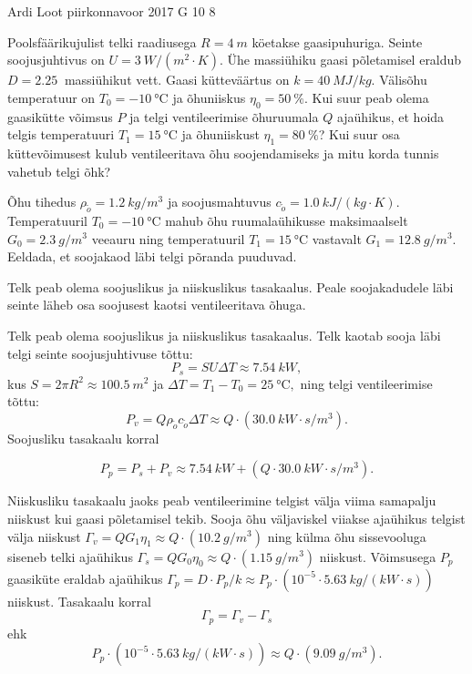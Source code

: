 {Ardi Loot} %
{piirkonnavoor} %
{2017} %
{G 10} %
{8} %
{
\ifStatement
Poolsfäärikujulist telki raadiusega $R=\SI{4}{m}$ köetakse
gaasipuhuriga. Seinte soojusjuhtivus on $U=\SI{3}{W/\left(m^{2}\cdot K\right)}$.
Ühe massiühiku gaasi põletamisel eraldub $D=\SI{2.25}{}$ massiühikut vett. Gaasi kütteväärtus on $k=\SI{40}{MJ/kg}$. Välisõhu temperatuur on $T_{0}=\SI{-10}{\celsius}$
ja õhuniiskus $\eta_{0}=\SI{50}{\percent}.$ Kui suur peab olema gaasikütte
võimsus $P$ ja telgi ventileerimise õhuruumala $Q$ ajaühikus, et hoida telgis
temperatuuri $T_{1}=\SI{15}{\celsius}$ ja õhuniiskust $\eta_{1}=\SI{80}{\percent}$?
Kui suur osa küttevõimusest kulub ventileeritava õhu soojendamiseks
ja mitu korda tunnis vahetub telgi õhk?

Õhu tihedus $\rho_{\tilde{o}}=\SI{1.2}{kg/m^{3}}$ ja soojusmahtuvus
$c_{\tilde{o}}=\SI{1.0}{kJ/\left(kg\cdot K\right)}$. Temperatuuril
$T_{0}=\SI{-10}{\celsius}$ mahub õhu ruumalaühikusse maksimaalselt
$G_{0}=\SI{2.3}{g/m^{3}}$ veeauru ning temperatuuril $T_{1}=\SI{15}{\celsius}$
vastavalt $G_{1}=\SI{12.8}{g/m^{3}}.$ Eeldada, et soojakaod läbi
telgi põranda puuduvad.
\fi


\ifHint
Telk peab olema soojuslikus ja niiskuslikus tasakaalus. Peale soojakadudele läbi seinte läheb osa soojusest kaotsi ventileeritava õhuga.
\fi


\ifSolution
Telk peab olema soojuslikus ja niiskuslikus tasakaalus. Telk kaotab
sooja läbi telgi seinte soojusjuhtivuse tõttu:
\[
P_{s}=SU\Delta T\approx\SI{7.54}{kW},
\]
kus $S=2\pi R^{2}\approx\SI{100.5}{m^{2}}$
ja $\Delta T=T_{1}-T_{0}=\SI{25}{\celsius},$ ning telgi ventileerimise tõttu:
\[
P_{v}=Q\rho_{\tilde{o}}c_{\tilde{o}}\Delta T\approx Q\cdot\left(\SI{30.0}{kW\cdot s/m^{3}}\right).
\]
Soojusliku tasakaalu korral

\begin{equation}
P_{p}=P_{s}+P_{v}\approx\SI{7.54}{kW}+\left(Q\cdot\SI{30.0}{kW\cdot s/m^{3}}\right).\label{eq:2017-v2g-10-gaas-eq1}
\end{equation}


Niiskusliku tasakaalu jaoks peab ventileerimine telgist välja viima
samapalju niiskust kui gaasi põletamisel tekib. Sooja õhu väljaviskel
viiakse ajaühikus telgist välja niiskust $\Gamma_{v}=QG_{1}\eta_{1}\approx Q\cdot\left(\SI{10.2}{g/m^{3}}\right)$
ning külma õhu sissevooluga siseneb telki ajaühikus $\Gamma_{s}=QG_{0}\eta_{0}\approx Q\cdot\left(\SI{1.15}{g/m^{3}}\right)$
niiskust. Võimsusega $P_{p}$ gaasiküte eraldab ajaühikus
$\Gamma_{p}=D\cdot P_{p}/k\approx P_{p}\cdot\left(10^{-5}\cdot\SI{5.63}{kg/\left(kW\cdot s\right)}\right)$
niiskust. Tasakaalu korral
\vspace{-3pt}
\[
\Gamma_{p}=\Gamma_{v}-\Gamma_{s}
\]
\vspace{-3pt}
\noindent ehk
\vspace{-3pt}
\begin{equation}
P_{p}\cdot\left(10^{-5}\cdot\SI{5.63}{kg/\left(kW\cdot s\right)}\right)\approx Q\cdot\left(\SI{9.09}{g/m^{3}}\right).\label{eq:2017-v2g-10-gaas-eq2}
\end{equation}


}
